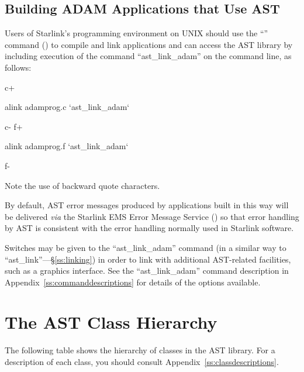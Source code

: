 \documentclass[twoside,11pt]{starlink}
\providecommand{\appref}[1]{Appendix~\ref{#1}}
\providecommand{\secref}[1]{\S\ref{#1}}
\begin{document}
\subsection{Building ADAM Applications that Use AST}

Users of Starlink's  programming environment
 on UNIX should use the
``'' command
() to compile and link applications and can
access the AST library by including execution of the command
``ast\_link\_adam'' on the command line, as follows:

c+
\begin{small}
\begin{terminalv}
alink adamprog.c `ast_link_adam`
\end{terminalv}
\end{small}
c-
f+
\begin{small}
\begin{terminalv}
alink adamprog.f `ast_link_adam`
\end{terminalv}
\end{small}
f-

Note the use of backward quote characters.

By default, AST error messages produced by applications built in this
way will be delivered \emph{via} the Starlink EMS Error Message
Service () so that error handling by AST is
consistent with the  error handling normally used in
Starlink software.

Switches may be given to the ``ast\_link\_adam'' command (in a similar
way to ``ast\_link''---\secref{ss:linking}) in order to link with
additional AST-related facilities, such as a graphics interface. See
the ``ast\_link\_adam'' command description in
\appref{ss:commanddescriptions} for details of the options available.

\appendix
\cleardoublepage
\section{\label{ss:classhierarchy}The AST Class Hierarchy}
The following table shows the hierarchy of classes in the AST library.
For a description of each class, you should consult
\appref{ss:classdescriptions}.
\end{document}
